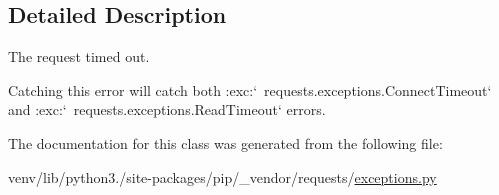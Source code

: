 \subsection{Detailed Description}
\begin{DoxyVerb}The request timed out.

Catching this error will catch both
:exc:`~requests.exceptions.ConnectTimeout` and
:exc:`~requests.exceptions.ReadTimeout` errors.
\end{DoxyVerb}
 

The documentation for this class was generated from the following file\+:\begin{DoxyCompactItemize}
\item 
venv/lib/python3./site-\/packages/pip/\+\_\+vendor/requests/\hyperlink{pip_2__vendor_2requests_2exceptions_8py}{exceptions.\+py}\end{DoxyCompactItemize}
